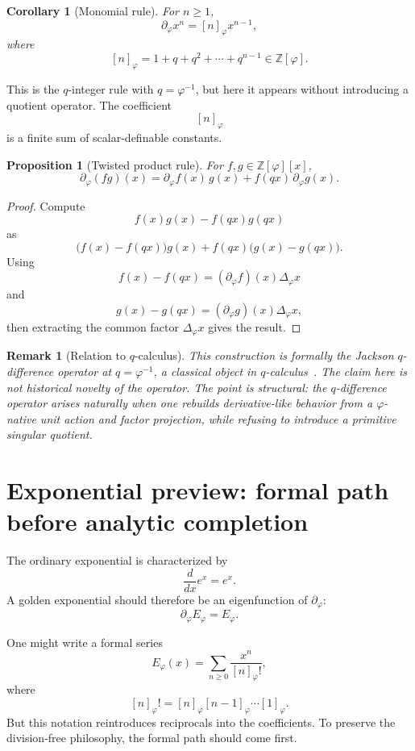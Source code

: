 \documentclass[11pt]{article}
\newtheorem{proposition}[definition]{Proposition}
\newtheorem{corollary}[definition]{Corollary}
\newtheorem{remark}[definition]{Remark}
\newcommand{\ph}{\varphi}
\newcommand{\Z}{\mathbb{Z}}
\begin{document}
\begin{corollary}[Monomial rule]
For $n\ge1$,
\[
    \partial_\ph x^n=[n]_\ph x^{n-1},
\]
where
\[
    [n]_\ph=1+q+q^2+\cdots+q^{n-1}\in\Z[\ph].
\]
\end{corollary}

This is the $q$-integer rule with $q=\ph^{-1}$, but here it appears without introducing a quotient operator.  The coefficient
\[
    [n]_\ph
\]
is a finite sum of scalar-definable constants.

\begin{proposition}[Twisted product rule]
For $f,g\in\Z[\ph][x]$,
\[
    \partial_\ph(fg)(x)=\partial_\ph f(x)\,g(x)+f(qx)\,\partial_\ph g(x).
\]
\end{proposition}

\begin{proof}
Compute
\[
    f(x)g(x)-f(qx)g(qx)
\]
as
\[
    \bigl(f(x)-f(qx)\bigr)g(x)+f(qx)\bigl(g(x)-g(qx)\bigr).
\]
Using
\[
    f(x)-f(qx)=(\partial_\ph f)(x)\Delta_\ph x
\]
and
\[
    g(x)-g(qx)=(\partial_\ph g)(x)\Delta_\ph x,
\]
then extracting the common factor $\Delta_\ph x$ gives the result.
\end{proof}

\begin{remark}[Relation to $q$-calculus]
This construction is formally the Jackson $q$-difference operator at $q=\ph^{-1}$, a classical object in $q$-calculus~\cite{Jackson1909,KacCheung2002}.  The claim here is not historical novelty of the operator.  The point is structural: the $q$-difference operator arises naturally when one rebuilds derivative-like behavior from a $\ph$-native unit action and factor projection, while refusing to introduce a primitive singular quotient.
\end{remark}

\section{Exponential preview: formal path before analytic completion}

The ordinary exponential is characterized by
\[
    \frac{d}{dx}e^x=e^x.
\]
A golden exponential should therefore be an eigenfunction of $\partial_\ph$:
\[
    \partial_\ph E_\ph=E_\ph.
\]

One might write a formal series
\[
    E_\ph(x)=\sum_{n\ge0}\frac{x^n}{[n]_\ph!},
\]
where
\[
    [n]_\ph!=[n]_\ph[n-1]_\ph\cdots[1]_\ph.
\]
But this notation reintroduces reciprocals into the coefficients.  To preserve the division-free philosophy, the formal path should come first.
\end{document}
